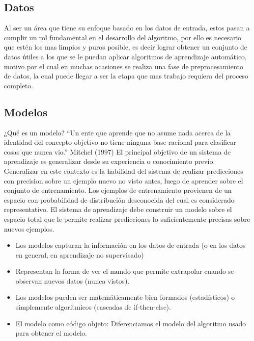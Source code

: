 \documentclass[a4paper,11pt,spanish]{book}
\begin{document}
    \subsection{Datos}
      Al ser un área que tiene su enfoque basado en los datos de entrada, estos pasan a cumplir un rol fundamental en el desarrollo del algoritmo, por ello es necesario que 
      estén los mas limpios y puros posible, es decir lograr obtener un conjunto de datos útiles a los que se le puedan aplicar algoritmos de aprendizaje automático, 
      motivo por el cual en muchas ocasiones se realiza una fase de preprocesamiento de datos, la cual puede llegar a ser la etapa que mas trabajo requiera del proceso completo. 

    \subsection{Modelos}

      ¿Qué es un modelo?
      “Un ente que aprende que no asume nada acerca de la identidad del concepto objetivo no tiene ninguna base racional para clasificar cosas que nunca vio.”
      Mitchel (1997)
      El principal objetivo de un sistema de aprendizaje es generalizar desde su experiencia o conocimiento previo. Generalizar en este contexto es la habilidad del sistema de realizar
      predicciones con precision sobre un ejemplo nuevo no visto antes, luego de aprender sobre el conjunto de entrenamiento. Los ejemplos de entrenamiento provienen de un espacio 
      con probabilidad de distribución desconocida del cual es considerado representativo. El sistema de aprendizaje debe construir un modelo sobre el espacio total que le permite realizar
      predicciones lo suficientemente precisas sobre nuevos ejemplos.
      \begin{itemize}
	\item Los modelos capturan la información en los datos de entrada (o en los datos en general, en aprendizaje no supervisado)
	\item Representan la forma de ver el mundo que permite extrapolar cuando se observan nuevos datos (nunca vistos).
	\item Los modelos pueden ser matemáticamente bien formados (estadísticos) o simplemente algoritmicos (cascadas de if-then-else).
	\item El modelo como código objeto: Diferenciamos el modelo del algoritmo usado para obtener el modelo.
      \end{itemize}
\end{document}
